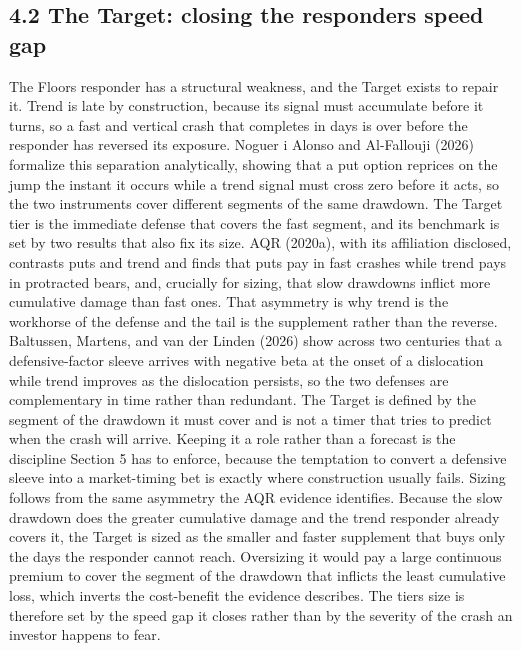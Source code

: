 \documentclass[12pt, a4paper]{article}
\begin{document}
\subsection*{4.2 The Target: closing the responder\textquotesingle s
speed gap}\label{the-target-closing-the-responders-speed-gap}

The Floor\textquotesingle s responder has a structural weakness, and the
Target exists to repair it. Trend is late by construction, because its
signal must accumulate before it turns, so a fast and vertical crash
that completes in days is over before the responder has reversed its
exposure. Noguer i Alonso and Al-Fallouji (2026) formalize this
separation analytically, showing that a put option reprices on the jump
the instant it occurs while a trend signal must cross zero before it
acts, so the two instruments cover different segments of the same
drawdown. The Target tier is the immediate defense that covers the fast
segment, and its benchmark is set by two results that also fix its size.
AQR (2020a), with its affiliation disclosed, contrasts puts and trend
and finds that puts pay in fast crashes while trend pays in protracted
bears, and, crucially for sizing, that slow drawdowns inflict more
cumulative damage than fast ones. That asymmetry is why trend is the
workhorse of the defense and the tail is the supplement rather than the
reverse. Baltussen, Martens, and van der Linden (2026) show across two
centuries that a defensive-factor sleeve arrives with negative beta at
the onset of a dislocation while trend improves as the dislocation
persists, so the two defenses are complementary in time rather than
redundant. The Target is defined by the segment of the drawdown it must
cover and is not a timer that tries to predict when the crash will
arrive. Keeping it a role rather than a forecast is the discipline
Section 5 has to enforce, because the temptation to convert a defensive
sleeve into a market-timing bet is exactly where construction usually
fails. Sizing follows from the same asymmetry the AQR evidence
identifies. Because the slow drawdown does the greater cumulative damage
and the trend responder already covers it, the Target is sized as the
smaller and faster supplement that buys only the days the responder
cannot reach. Oversizing it would pay a large continuous premium to
cover the segment of the drawdown that inflicts the least cumulative
loss, which inverts the cost-benefit the evidence describes. The
tier\textquotesingle s size is therefore set by the speed gap it closes
rather than by the severity of the crash an investor happens to fear.
\end{document}
